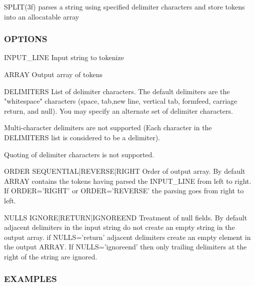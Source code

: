 S\+P\+L\+I\+T(3f) parses a string using specified delimiter characters and store tokens into an allocatable array

\subsubsection*{O\+P\+T\+I\+O\+NS}

\begin{DoxyVerb}INPUT_LINE  Input string to tokenize

ARRAY       Output array of tokens

DELIMITERS  List of delimiter characters.
            The default delimiters are the "whitespace" characters
            (space, tab,new line, vertical tab, formfeed, carriage
            return, and null). You may specify an alternate set of
            delimiter characters.

            Multi-character delimiters are not supported (Each
            character in the DELIMITERS list is considered to be
            a delimiter).

            Quoting of delimiter characters is not supported.

ORDER SEQUENTIAL|REVERSE|RIGHT  Order of output array.
            By default ARRAY contains the tokens having parsed
            the INPUT_LINE from left to right. If ORDER='RIGHT'
            or ORDER='REVERSE' the parsing goes from right to left.

NULLS IGNORE|RETURN|IGNOREEND  Treatment of null fields.
            By default adjacent delimiters in the input string
            do not create an empty string in the output array. if
            NULLS='return' adjacent delimiters create an empty element
            in the output ARRAY. If NULLS='ignoreend' then only
            trailing delimiters at the right of the string are ignored.
\end{DoxyVerb}


\subsubsection*{E\+X\+A\+M\+P\+L\+ES}

